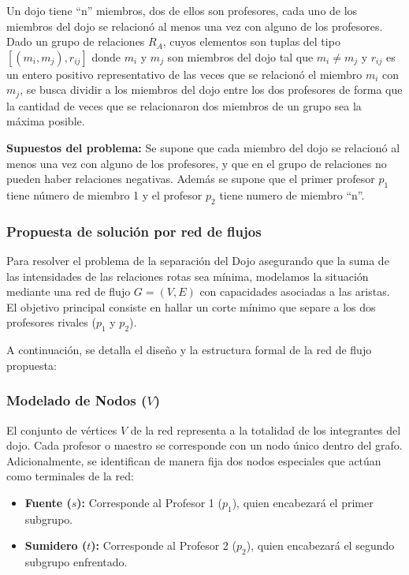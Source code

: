 \documentclass[12pt]{article}
\begin{document}
            Un dojo tiene ``n'' miembros, dos de ellos son profesores, cada uno de los miembros del dojo se relacionó al menos una vez con alguno de los profesores. Dado un grupo de relaciones $R_{A}$, cuyos elementos son tuplas del tipo $[(m_{i}, m_{j}), r_{ij}]$ donde $m_{i}$ y $m_{j}$ son miembros del dojo tal que $m_{i} \ne m_{j}$ y $r_{ij}$ es un entero positivo representativo de las veces que se relacionó el miembro $m_{i}$ con $m_{j}$, se busca dividir a los miembros del dojo entre los dos profesores de forma que la cantidad de veces que se relacionaron dos miembros de un grupo sea la máxima posible. 

            \textbf{Supuestos del problema:} Se supone que cada miembro del dojo se relacionó al menos una vez con alguno de los profesores, y que en el grupo de relaciones no pueden haber relaciones negativas. Además se supone que el primer profesor $p_1$ tiene número de miembro 1 y el profesor $p_2$ tiene numero de miembro ``n''.

        \subsubsection{Propuesta de solución por red de flujos}

            Para resolver el problema de la separación del Dojo asegurando que la suma de las intensidades de las relaciones rotas sea mínima, modelamos la situación mediante una red de flujo $G = (V, E)$ con capacidades asociadas a las aristas. El objetivo principal consiste en hallar un corte mínimo que separe a los dos profesores rivales ($p_1$ y $p_2$).

            A continuación, se detalla el diseño y la estructura formal de la red de flujo propuesta:

        \subsubsection{Modelado de Nodos ($V$)}
            El conjunto de vértices $V$ de la red representa a la totalidad de los integrantes del dojo. Cada profesor o maestro se corresponde con un nodo único dentro del grafo. Adicionalmente, se identifican de manera fija dos nodos especiales que actúan como terminales de la red:
            
            \begin{itemize}
                \item \textbf{Fuente ($s$):} Corresponde al Profesor 1 ($p_1$), quien encabezará el primer subgrupo.
                \item \textbf{Sumidero ($t$):} Corresponde al Profesor 2 ($p_2$), quien encabezará el segundo subgrupo enfrentado.
            \end{itemize}
\end{document}
